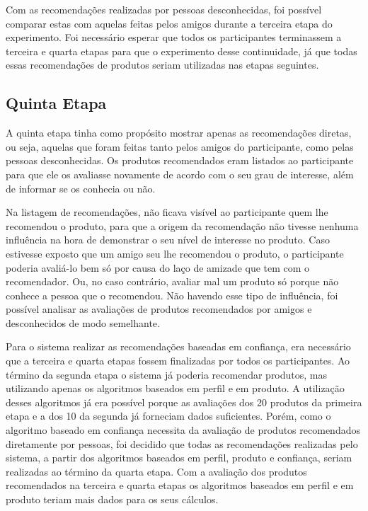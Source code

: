 Com as recomendações realizadas por pessoas desconhecidas, foi possível comparar estas com aquelas feitas pelos amigos durante a terceira etapa do experimento. Foi necessário esperar que todos os participantes terminassem a terceira e quarta etapas para que o experimento desse continuidade, já que todas essas recomendações de produtos seriam utilizadas nas etapas seguintes.

\subsection{Quinta Etapa}

A quinta etapa tinha como propósito mostrar apenas as recomendações diretas, ou seja, aquelas que foram feitas tanto pelos amigos do participante, como pelas pessoas desconhecidas. Os produtos recomendados eram listados ao participante para que ele os avaliasse novamente de acordo com o seu grau de interesse, além de informar se os conhecia ou não.

Na listagem de recomendações, não ficava visível ao participante quem lhe recomendou o produto, para que a origem da recomendação não tivesse nenhuma influência na hora de demonstrar o seu nível de interesse no produto. Caso estivesse exposto que um amigo seu lhe recomendou o produto, o participante poderia avaliá-lo bem só por causa do laço de amizade que tem com o recomendador. Ou, no caso contrário, avaliar mal um produto só porque não conhece a pessoa que o recomendou. Não havendo esse tipo de influência, foi possível analisar as avaliações de produtos recomendados por amigos e desconhecidos de modo semelhante.

Para o sistema realizar as recomendações baseadas em confiança, era necessário que a terceira e quarta etapas fossem finalizadas por todos os participantes. Ao término da segunda etapa o sistema já poderia recomendar produtos, mas utilizando apenas os algoritmos baseados em perfil e em produto. A utilização desses algoritmos já era possível porque as avaliações dos 20 produtos da primeira etapa e a dos 10 da segunda já forneciam dados suficientes. Porém, como o algoritmo baseado em confiança necessita da avaliação de produtos recomendados diretamente por pessoas, foi decidido que todas as recomendações realizadas pelo sistema, a partir dos algoritmos baseados em perfil, produto e confiança, seriam realizadas ao término da quarta etapa. Com a avaliação dos produtos recomendados na terceira e quarta etapas os algoritmos baseados em perfil e em produto teriam mais dados para os seus cálculos.

